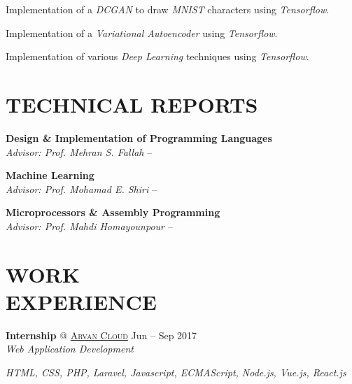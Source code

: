 \documentclass[margin, 10pt]{res} %
\begin{document}
\begin{resume}
\begin{innerlist}
		\item Implementation of a \textit{DCGAN} to draw \textit{MNIST} characters using \textit{Tensorflow}.
		
		\item Implementation of a \textit{Variational Autoencoder} 	using \textit{Tensorflow}.
		
		\item Implementation of various \textit{Deep Learning} techniques using \textit{Tensorflow}.
		
	\end{innerlist}

  	\vspace{0.5cm}
     
    \section{TECHNICAL REPORTS}
    \textbf{Design \& Implementation of Programming Languages}\\
    \textit{Advisor: Prof. Mehran S. Fallah} -- 
    \href{https://github.com/aligholamee/HALFLIFE/tree/master/reports}{\UrlFont[docs]}
    
    \textbf{Machine Learning}\\
    \textit{Advisor: Prof. Mohamad E. Shiri} --
    \href{https://github.com/aligholamee/Hornburg}{\UrlFont[docs]}
    
    \textbf{Microprocessors \& Assembly Programming}\\
    \textit{Advisor: Prof. Mahdi Homayounpour} --
    \href{https://github.com/aligholamee/Microprocessors}{\UrlFont[docs]}

  	\vspace{0.5cm}
    
    \section{WORK \\ EXPERIENCE}
	\textbf{Internship} \textsc{@}
	\href{https://www.arvancloud.com/}{\textsc{Arvan Cloud}}
	\hfill {Jun -- Sep 2017}\\
	\textit{Web Application Development}
	\begin{innerlist}
		\item \textit{HTML, CSS, PHP, Laravel, Javascript, ECMAScript, Node.js, Vue.js, React.js}
	\end{innerlist}
	

\end{resume}
\end{document}
